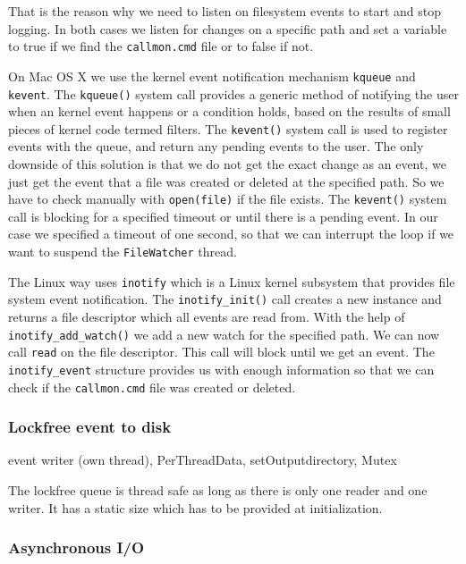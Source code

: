 That is the reason why we need to listen on filesystem events to start and stop logging. In both cases we listen for changes on a specific path and set a variable to true if we find the \verb=callmon.cmd= file or to false if not.

On Mac OS X we use the kernel event notification mechanism \verb=kqueue= and \verb=kevent=. The \verb=kqueue()= system call provides a generic method of notifying the user when an kernel event happens or a condition holds, based on the results of small pieces of kernel code termed filters. The \verb=kevent()= system call is used to register events with the queue, and return any pending events to the user. The only downside of this solution is that we do not get the exact change as an event, we just get the event that a file was created or deleted at the specified path. So we have to check manually with \verb=open(file)= if the file exists. The \verb=kevent()= system call is blocking for a specified timeout or until there is a pending event. In our case we specified a timeout of one second, so that we can interrupt the loop if we want to suspend the \verb=FileWatcher= thread.

The Linux way uses \verb=inotify= which is a Linux kernel subsystem that provides file system event notification. The \verb=inotify_init()= call creates a new instance and returns a file descriptor which all events are read from. With the help of \verb=inotify_add_watch()= we add a new watch for the specified path. We can now call \verb=read= on the file descriptor. This call will block until we get an event. The \verb=inotify_event= structure provides us with enough information so that we can check if the \verb=callmon.cmd= file was created or deleted.

\subsubsection{Lockfree event to disk} 

event writer (own thread), PerThreadData, setOutputdirectory, Mutex

The lockfree queue is thread safe as long as there is only one reader and one writer. It has a static size which has to be provided at initialization. 

\subsubsection{Asynchronous I/O}

